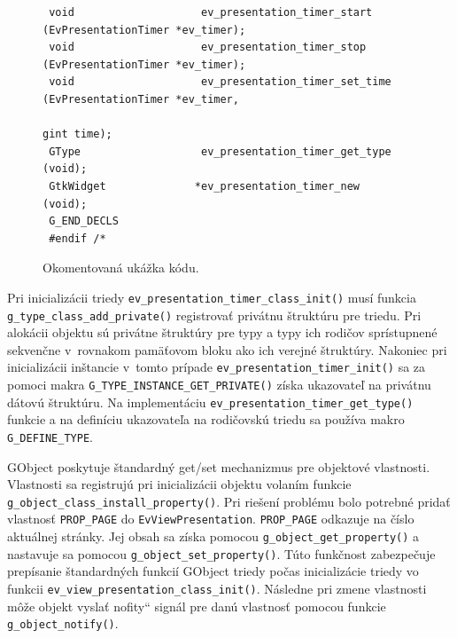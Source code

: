 \documentclass[12pt,oneside,final]{fithesis2}
\newcommand\uv[1]{\quotedblbase #1\textquotedblleft}
\begin{document}
\begin{figure}[hb]
\begin{tiny}
\begin{verbatim}
 void                    ev_presentation_timer_start             (EvPresentationTimer *ev_timer);
 void                    ev_presentation_timer_stop              (EvPresentationTimer *ev_timer);
 void                    ev_presentation_timer_set_time          (EvPresentationTimer *ev_timer,
                                                                  gint time);
 GType                   ev_presentation_timer_get_type          (void);
 GtkWidget              *ev_presentation_timer_new               (void);
 G_END_DECLS
 #endif /*
\end{verbatim}
\end{tiny}
\caption{Okomentovaná ukážka kódu.}
\label{ev-presentation-timer.h}
\end{figure}

Pri inicializácii triedy \texttt{ev\_presentation\_timer\_class\_init()} musí funkcia \texttt{g\_type\_class\_add\_private()} registrovať privátnu štruktúru pre triedu\cite{gprivate}. Pri alokácii objektu sú privátne štruktúry pre typy a typy ich rodičov sprístupnené sekvenčne v~rovnakom pamäťovom bloku ako ich verejné štruktúry. Nakoniec pri inicializácii inštancie v~tomto prípade \texttt{ev\_presentation\_timer\_init()} sa za pomoci makra \texttt{G\_TYPE\_INSTANCE\_GET\_PRIVATE()} získa ukazovateľ na privátnu dátovú štruktúru. Na implementáciu \texttt{ev\_presentation\_timer\_get\_type()} funkcie a na definíciu ukazovateľa na rodičovskú triedu sa používa makro \texttt{G\_DEFINE\_TYPE}.

GObject poskytuje štandardný get/set mechanizmus pre objektové vlastnosti. Vlastnosti sa registrujú pri inicializácii objektu volaním funkcie \texttt{g\_object\_class\_install\_property()}. Pri riešení problému bolo potrebné pridať vlastnosť \texttt{PROP\_PAGE} do \texttt{EvViewPresentation}. \texttt{PROP\_PAGE} odkazuje na číslo aktuálnej stránky. Jej obsah sa získa pomocou \texttt{g\_object\_get\_property()} a nastavuje sa pomocou \texttt{g\_object\_set\_property()}. Túto funkčnost zabezpečuje prepísanie štandardných funkcií GObject triedy počas inicializácie triedy vo funkcii \texttt{ev\_view\_presentation\_class\_init()}. Následne pri zmene vlastnosti môže objekt vyslať \uv{nofity} signál pre danú vlastnosť pomocou funkcie \texttt{g\_object\_notify()}.
\end{document}
